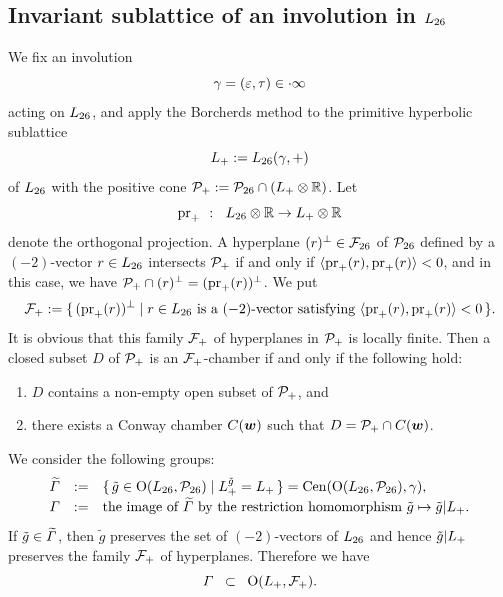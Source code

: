 \documentclass{amsart} %
\begin{document}
\subsection{Invariant sublattice of an involution in $L_{26}$}\label{subsec:sublatLts}
%
We fix an involution
%
\begin{equation*}\label{eq:gamma}
\gamma=(\varepsilon, \tau)\in \cdot \infty
\end{equation*}
%
 acting on $L_{26}$, and 
 apply the Borcherds method to the primitive hyperbolic sublattice
\[
L_{+}:=L_{26}(\gamma, +)
\]
of $L_{26}$ 
with the positive cone $\mathord{\mathcal{P}}_{+}:=\mathord{\mathcal{P}}_{26}\cap(L_{+}\otimes \mathord{\mathbb{R}})$.
Let
\[
\operatorname{pr}_{+}\;\;\colon\;\; L_{26}\otimes \mathord{\mathbb{R}} \to L_{+}\otimes \mathord{\mathbb{R}}
\]
denote the orthogonal projection.
A hyperplane $(r)^{\perp}\in {\mathord{\mathcal{F}}}_{26}$ of $\mathord{\mathcal{P}}_{26}$
defined by a $(-2)$-vector $r\in L_{26}$
intersects $\mathord{\mathcal{P}}_{+}$
if and only if
$\langle \operatorname{pr}_{+}(r), \operatorname{pr}_{+}(r) \rangle<0$,
and in this case,
we have $ \mathord{\mathcal{P}}_{+}\cap (r)^{\perp}=(\operatorname{pr}_{+}(r))^{\perp}$.
We put
\[
\mathord{\mathcal{F}}_{+}:=\{\,{(\operatorname{pr}_{+}(r))^{\perp}}\mid {\textrm{$r\in L_{26}$ is a $(-2)$-vector satisfying 
$\langle \operatorname{pr}_{+}(r), \operatorname{pr}_{+}(r) \rangle<0$}} \,\}.
\]
It is obvious that this family $\mathord{\mathcal{F}}_{+}$ of hyperplanes in $\mathord{\mathcal{P}}_{+}$ is locally finite.
Then a closed subset $D$ of $\mathord{\mathcal{P}}_{+}$ is 
an $\mathord{\mathcal{F}}_{+}$-chamber if and only if the following hold:
%
\begin{enumerate}[label=(\alph*)]
\item 
$D$ contains a non-empty open subset of $\mathord{\mathcal{P}}_{+}$, and 
\item there exists a Conway chamber $\mathord{C}(\boldsymbol{w})$
such that $D=\mathord{\mathcal{P}}_{+}\cap \mathord{C}(\boldsymbol{w})$.
\end{enumerate}
%
We consider the following groups: 
%
\begin{equation}\label{eq:vGamdef}
\renewcommand{\arraystretch}{1.2}
\begin{array}{ccl}
\tilvGam &:=& \set{\tilde{g}\in \OG(\Lts, \PPPts)}{\Lplus^{\tilde{g}}=\Lplus}=\Cen(\OG(\Lts, \PPPts), \gamma), \\
\vGam &:=& \textrm{the image of $\tilvGam$ by the restriction homomorphism 
$\tilde{g}\mapsto \tilde{g}|\Lplus$}.
\end{array}
\end{equation}
%
%
If $\tilde{g}\in \widetilde{\varGamma}$,
then $\tilde{g}$ preserves the set of $(-2)$-vectors of $L_{26}$ and hence $\tilde{g}|L_{+}$
preserves the family $\mathord{\mathcal{F}}_{+}$ of hyperplanes.
Therefore we have
\[
\varGamma\;\;\subset \;\; \mathord{\mathrm{O}}(L_{+}, \mathord{\mathcal{F}}_{+}).
\]
\end{document}
